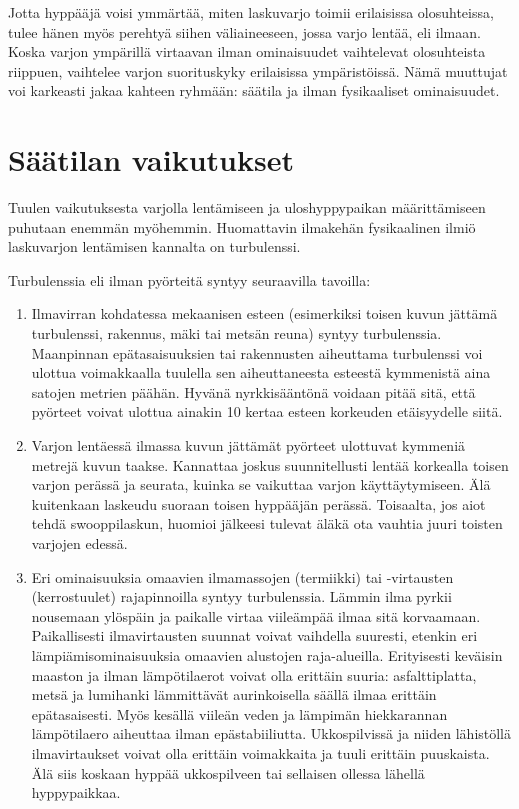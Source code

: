 
Jotta hyppääjä voisi ymmärtää, miten laskuvarjo toimii erilaisissa olosuhteissa, tulee hänen myös perehtyä siihen väliaineeseen, jossa varjo lentää, eli ilmaan. Koska varjon ympärillä virtaavan ilman ominaisuudet vaihtelevat olosuhteista riippuen, vaihtelee varjon suorituskyky erilaisissa ympäristöissä. Nämä muuttujat voi karkeasti jakaa kahteen ryhmään: säätila ja ilman fysikaaliset ominaisuudet. 

\section{ Säätilan vaikutukset }
\label{ilmakehan-fysikaalisten-ominaisuuksien-vaikutukset-laskuvarjon-suorituskykyyn-saatilan-vaikutukset}


Tuulen vaikutuksesta varjolla lentämiseen ja uloshyppypaikan määrittämiseen puhutaan enemmän myöhemmin. Huomattavin ilmakehän fysikaalinen ilmiö laskuvarjon lentämisen kannalta on turbulenssi. 


Turbulenssia eli ilman pyörteitä syntyy seuraavilla tavoilla: 

\begin{enumerate}[label=\bfseries \arabic*)]
\item  Ilmavirran kohdatessa mekaanisen esteen (esimerkiksi toisen kuvun jättämä turbulenssi, rakennus, mäki tai metsän reuna) syntyy turbulenssia. Maanpinnan epätasaisuuksien tai rakennusten aiheuttama turbulenssi voi ulottua voimakkaalla tuulella sen aiheuttaneesta esteestä kymmenistä aina satojen metrien päähän. Hyvänä nyrkkisääntönä voidaan pitää sitä, että pyörteet voivat ulottua ainakin 10 kertaa esteen korkeuden etäisyydelle siitä. 
\item  Varjon lentäessä ilmassa kuvun jättämät pyörteet ulottuvat kymmeniä metrejä kuvun taakse. Kannattaa joskus suunnitellusti lentää korkealla toisen varjon perässä ja seurata, kuinka se vaikuttaa varjon käyttäytymiseen. Älä kuitenkaan laskeudu suoraan toisen hyppääjän perässä. Toisaalta, jos aiot tehdä swooppilaskun, huomioi jälkeesi tulevat äläkä ota vauhtia juuri toisten varjojen edessä.   
\item  Eri ominaisuuksia omaavien ilmamassojen (termiikki) tai -virtausten (kerrostuulet) rajapinnoilla syntyy turbulenssia. Lämmin ilma pyrkii nousemaan ylöspäin ja paikalle virtaa viileämpää ilmaa sitä korvaamaan. Paikallisesti ilmavirtausten suunnat voivat vaihdella suuresti, etenkin eri lämpiämisominaisuuksia omaavien alustojen raja-alueilla. Erityisesti keväisin maaston ja ilman lämpötilaerot voivat olla erittäin suuria: asfalttiplatta, metsä ja lumihanki lämmittävät aurinkoisella säällä ilmaa erittäin epätasaisesti. Myös kesällä viileän veden ja lämpimän hiekkarannan lämpötilaero aiheuttaa ilman epästabiiliutta. Ukkospilvissä ja niiden lähistöllä ilmavirtaukset voivat olla erittäin voimakkaita ja tuuli erittäin puuskaista. Älä siis koskaan hyppää ukkospilveen tai sellaisen ollessa lähellä hyppypaikkaa. 
\end{enumerate}

